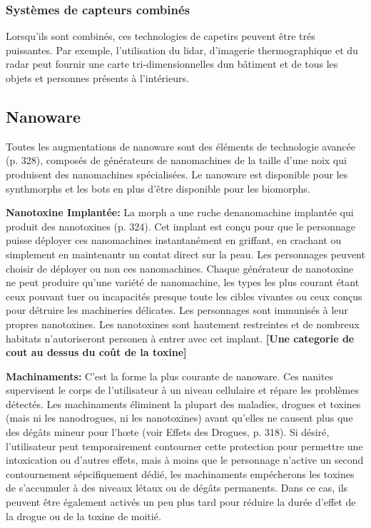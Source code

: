 \subsubsection{Systèmes de capteurs combinés} 

Lorsqu'ils sont combinés, ces technologies de capetirs peuvent être trés puissantes. Par exemple, l'utilisation du lidar, d'imagerie thermographique et du radar peut fournir une carte tri-dimensionnelles dun bâtiment et de tous les objets et personnes présents à l'intérieurs. 

\subsection{Nanoware} \label{sec:nanoware} 

Toutes les augmentations de nanoware sont des éléments de technologie avancée (p. 328), composés de générateurs de nanomachines de la taille d'une noix qui produisent des nanomachines spécialisées. Le nanoware est disponible pour les synthmorphs et les bots en plus d'être disponible pour les biomorphs. 

\textbf{Nanotoxine Implantée:} La morph a une ruche denanomachine implantée qui produit des nanotoxines (p. 324). Cet implant est conçu pour que le personnage puisse déployer ces nanomachines instantanément en griffant, en crachant ou simplement en maintenantr un contat direct sur la peau. Les personnages peuvent choisir de déployer ou non ces nanomachines. Chaque générateur de nanotoxine ne peut produire qu'une variété de nanomachine, les types les plus courant étant ceux pouvant tuer ou incapacités presque toute les cibles vivantes ou ceux conçus pour détruire les machineries délicates. Les personnages sont immunisés à leur propres nanotoxines. Les nanotoxines sont hautement restreintes et de nombreux habitats n'autoriseront personen à entrer avec cet implant. \textbf{[Une categorie de cout au dessus du coût de la toxine]} 

\textbf{Machinaments:} C'est la forme la plus courante de nanoware. Ces nanites supervisent le corps de l'utilisateur à un niveau cellulaire et répare les problèmes détectés. Les machinaments éliminent la plupart des maladies, drogues et toxines (mais ni les nanodrogues, ni les nanotoxines) avant qu'elles ne causent plus que des dégâts mineur pour l'hœte (voir Effets des Drogues, p. 318). Si désiré, l'utilisateur peut temporairement contourner cette protection pour permettre une intoxication ou d'autres effets, mais à moins que le personnage n'active un second contournement sépcifiquement dédié, les machinaments empécherons les toxines de s'accumuler à des niveaux létaux ou de dégâts permanents. Dans ce cas, ils peuvent être également activés un peu plus tard pour réduire la durée d'effet de la drogue ou de la toxine de moitié. 

